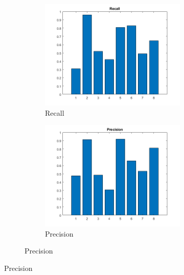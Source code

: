 \begin{figure}[h]
	\centering
	\begin{subfigure}{0.3\textwidth}
		\begin{subfigure}[t]{\textwidth}
			\includegraphics[width=\textwidth]{figures/recall_75C_5NN_2S.png} 
			\caption{Recall}
		\end{subfigure}
		\begin{subfigure}[t]{\textwidth}
			\includegraphics[width=\textwidth]{figures/precision_75C_5NN_2S.png}
			\caption{Precision}
		\end{subfigure}


\end{subfigure}
\end{figure}
